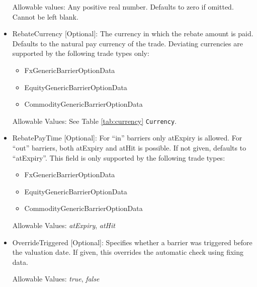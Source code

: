 \begin{itemize}
Allowable values:  Any positive real number. Defaults to zero if omitted. Cannot be left blank.

\item RebateCurrency [Optional]: The currency in which the rebate amount is paid. Defaults to the natural pay currency
  of the trade. Deviating currencies are supported by the following trade types only:

  \begin{itemize}
  \item FxGenericBarrierOptionData
  \item EquityGenericBarrierOptionData
  \item CommodityGenericBarrierOptionData
  \end{itemize}

  Allowable Values: See Table \ref{tab:currency} \lstinline!Currency!.

\item RebatePayTime [Optional]: For ``in'' barriers only atExpiry is allowed. For ``out'' barriers, both atExpiry and
  atHit is possible. If not given, defaults to ``atExpiry''. This field is only supported by the following trade types:

  \begin{itemize}
  \item FxGenericBarrierOptionData
  \item EquityGenericBarrierOptionData
  \item CommodityGenericBarrierOptionData
  \end{itemize}

  Allowable Values: \emph{atExpiry}, \emph{atHit}

\item OverrideTriggered [Optional]: Specifies whether a barrier was triggered before the valuation date. If given, this overrides the automatic check using fixing data.

  Allowable Values: \emph{true}, \emph{false}

\end{itemize}

